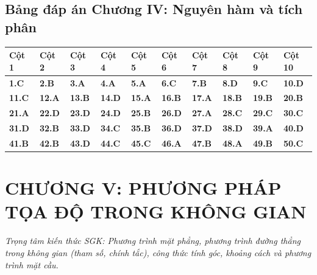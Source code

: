 \documentclass[11pt,a4paper]{article}
\begin{document}
\subsection*{\color{primary} Bảng đáp án Chương IV: Nguyên hàm và tích phân}
\begin{center}
\renewcommand{\arraystretch}{1.25}
\begin{tabularx}{\textwidth}{*{10}{>{\centering\arraybackslash}X}}
\toprule
\textbf{\color{primary} Cột 1} & \textbf{\color{primary} Cột 2} & \textbf{\color{primary} Cột 3} & \textbf{\color{primary} Cột 4} & \textbf{\color{primary} Cột 5} & \textbf{\color{primary} Cột 6} & \textbf{\color{primary} Cột 7} & \textbf{\color{primary} Cột 8} & \textbf{\color{primary} Cột 9} & \textbf{\color{primary} Cột 10} \\
\midrule
\textbf{1.C} & \textbf{2.B} & \textbf{3.A} & \textbf{4.A} & \textbf{5.A} & \textbf{6.C} & \textbf{7.B} & \textbf{8.D} & \textbf{9.C} & \textbf{10.D} \\
\rowcolor{rowtint} \textbf{11.C} & \textbf{12.A} & \textbf{13.B} & \textbf{14.D} & \textbf{15.A} & \textbf{16.B} & \textbf{17.A} & \textbf{18.B} & \textbf{19.B} & \textbf{20.B} \\
\textbf{21.A} & \textbf{22.D} & \textbf{23.D} & \textbf{24.D} & \textbf{25.B} & \textbf{26.D} & \textbf{27.A} & \textbf{28.C} & \textbf{29.C} & \textbf{30.C} \\
\rowcolor{rowtint} \textbf{31.D} & \textbf{32.B} & \textbf{33.D} & \textbf{34.C} & \textbf{35.B} & \textbf{36.D} & \textbf{37.D} & \textbf{38.D} & \textbf{39.A} & \textbf{40.D} \\
\textbf{41.B} & \textbf{42.B} & \textbf{43.D} & \textbf{44.C} & \textbf{45.C} & \textbf{46.A} & \textbf{47.B} & \textbf{48.A} & \textbf{49.B} & \textbf{50.C} \\
\bottomrule
\end{tabularx}
\end{center}\vspace{10pt}
\section*{\color{primary} CHƯƠNG V: PHƯƠNG PHÁP TỌA ĐỘ TRONG KHÔNG GIAN}
\textit{Trọng tâm kiến thức SGK: Phương trình mặt phẳng, phương trình đường thẳng trong không gian (tham số, chính tắc), công thức tính góc, khoảng cách và phương trình mặt cầu.}\par\vspace{4pt}
\end{document}
